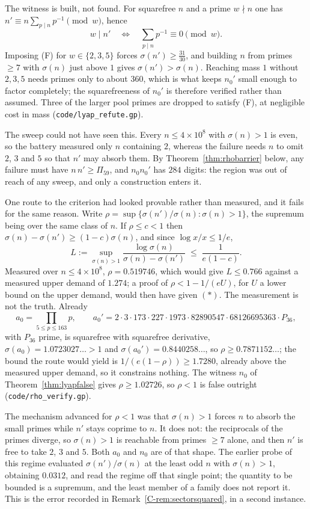 \documentclass[11pt]{article}
\theoremstyle{definition}
\begin{document}
The witness is built, not found. For squarefree $n$ and a prime $w\nmid n$ one has
$n'\equiv n\sum_{p\mid n}p^{-1}\pmod w$, hence
\[ w\mid n'\quad\Longleftrightarrow\quad \sum_{p\mid n}p^{-1}\equiv0 \pmod w. \tag{F} \]
Imposing (F) for $w\in\{2,3,5\}$ forces $\sigma(n')\ge\tfrac{31}{30}$, and building $n$ from primes
$\ge7$ with $\sigma(n)$ just above $1$ gives $\sigma(n')>\sigma(n)$. Reaching mass $1$ without
$2,3,5$ needs primes only to about $360$, which is what keeps $n_0'$ small enough to factor
completely; the squarefreeness of $n_0'$ is therefore verified rather than assumed. Three of the
larger pool primes are dropped to satisfy (F), at negligible cost in mass
\textup{(\texttt{code/lyap\_refute.gp})}.

The sweep could not have seen this. Every $n\le4\times10^8$ with $\sigma(n)>1$ is even, so the
battery measured only $n$ containing $2$, whereas the failure needs $n$ to omit $2$, $3$ and $5$ so
that $n'$ may absorb them. By Theorem~\ref{thm:rhobarrier} below, any failure must have
$n\,n'\ge\Pi_{59}$, and $n_0n_0'$ has $284$ digits: the region was out of reach of any sweep, and
only a construction enters it.

One route to the criterion had looked provable rather than measured, and it fails for the same
reason. Write $\rho=\sup\{\sigma(n')/\sigma(n):\sigma(n)>1\}$, the supremum being over the same
class of $n$. If $\rho\le c<1$ then $\sigma(n)-\sigma(n')\ge(1-c)\sigma(n)$, and since
$\log x/x\le1/e$,
\[ L:=\sup_{\sigma(n)>1}\frac{\log\sigma(n)}{\sigma(n)-\sigma(n')}\;\le\;\frac1{e(1-c)} . \]
Measured over $n\le4\times10^8$, $\rho=0.519746$, which would give $L\le0.766$ against a measured
upper demand of $1.274$; a proof of $\rho<1-1/(eU)$, for $U$ a lower bound on the upper demand,
would then have given $(\ast)$. The measurement is not the truth. Already
\[ a_0=\!\!\prod_{5\le p\le163}\!\!p,\qquad
   a_0'=2\cdot3\cdot173\cdot227\cdot1973\cdot82890547\cdot68126695363\cdot P_{36}, \]
with $P_{36}$ prime, is squarefree with squarefree derivative, $\sigma(a_0)=1.0723027\ldots>1$ and
$\sigma(a_0')=0.8440258\ldots$, so $\rho\ge0.7871152\ldots$; the bound the route would yield is
$1/(e(1-\rho))\ge1.7280$, already above the measured upper demand, so it constrains nothing. The
witness $n_0$ of Theorem~\ref{thm:lyapfalse} gives $\rho\ge1.02726$, so $\rho<1$ is false outright
\textup{(\texttt{code/rho\_verify.gp})}.

The mechanism advanced for $\rho<1$ was that $\sigma(n)>1$ forces $n$ to absorb the small primes
while $n'$ stays coprime to $n$. It does not: the reciprocals of the primes diverge, so $\sigma(n)>1$
is reachable from primes $\ge7$ alone, and then $n'$ is free to take $2$, $3$ and $5$. Both $a_0$ and
$n_0$ are of that shape. The earlier probe of this regime evaluated $\sigma(n')/\sigma(n)$ at the
least odd $n$ with $\sigma(n)>1$, obtaining $0.0312$, and read the regime off that single point;
the quantity to be bounded is a supremum, and the least member of a family does not report it. This
is the error recorded in Remark~\ref{C-rem:sectorsquared}, in a second instance.
\end{document}
